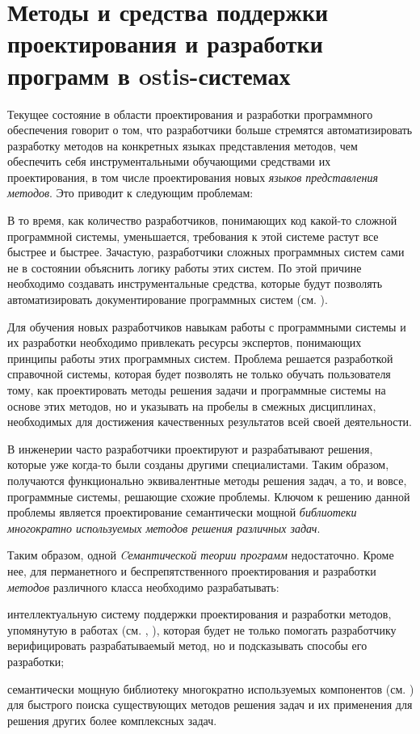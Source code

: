 \section{Методы и средства поддержки проектирования и разработки программ в ostis-системах}
\label{sec_programs_help_system}

Текущее состояние в области проектирования и разработки программного обеспечения говорит о том, что разработчики больше стремятся автоматизировать разработку методов на конкретных языках представления методов, чем обеспечить себя инструментальными обучающими средствами их проектирования, в том числе проектирования новых \textit{языков представления методов}. Это приводит к следующим проблемам:
\begin{textitemize}
	\item В то время, как количество разработчиков, понимающих код какой-то сложной программной системы, уменьшается, требования к этой системе растут все быстрее и быстрее. Зачастую, разработчики сложных программных систем сами не в состоянии объяснить логику работы этих систем. По этой причине необходимо создавать инструментальные средства, которые будут позволять автоматизировать документирование программных систем (см. ).
	\item Для обучения новых разработчиков навыкам работы с программными системы и их разработки необходимо привлекать ресурсы экспертов, понимающих принципы работы этих программных систем. Проблема решается разработкой справочной системы, которая будет позволять не только обучать пользователя тому, как проектировать методы решения задачи и программные системы на основе этих методов, но и указывать на пробелы в смежных дисциплинах, необходимых для достижения качественных результатов всей своей деятельности.
	\item В инженерии часто разработчики проектируют и разрабатывают решения, которые уже когда-то были созданы другими специалистами. Таким образом, получаются функционально эквивалентные методы решения задач, а то, и вовсе, программные системы, решающие схожие проблемы. Ключом к решению данной проблемы является проектирование семантически мощной \textit{библиотеки многократно используемых методов решения различных задач}.
\end{textitemize}

Таким образом, одной \textit{Cемантической теории программ} недостаточно. Кроме нее, для перманетного и беспрепятственного проектирования и разработки \textit{методов} различного класса необходимо разрабатывать:
\begin{textitemize}
	\item интеллектуальную систему поддержки проектирования и разработки методов, упомянутую в работах (см. , ), которая будет не только помогать разработчику верифицировать разрабатываемый метод, но и подсказывать способы его разработки;
	\item семантически мощную библиотеку многократно используемых компонентов (см. ) для быстрого поиска существующих методов решения задач и их применения для решения других более комплексных задач.
\end{textitemize}

